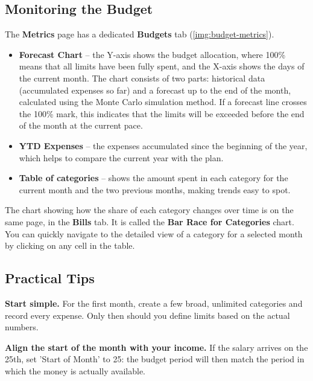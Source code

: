 

\newpage
\subsection{Monitoring the Budget}
\label{budget:metrics}

The \textbf{Metrics} page has a dedicated \textbf{Budgets} tab (\cref{img:budget-metrics}).


\begin{itemize}
  \item \textbf{Forecast Chart} -- the Y-axis shows the budget allocation, where 100\% means
  that all limits have been fully spent, and the X-axis shows the days of the current month.
  The chart consists of two parts: historical data (accumulated expenses so far) and a
  forecast up to the end of the month, calculated using the Monte Carlo simulation method. If
  a forecast line crosses the 100\% mark, this indicates that the limits will be exceeded
  before the end of the month at the current pace.
  \item \textbf{YTD Expenses} -- the expenses accumulated since the beginning of the year,
  which helps to compare the current year with the plan.
  \item \textbf{Table of categories} -- shows the amount spent in each category for the
  current month and the two previous months, making trends easy to spot.
\end{itemize}

\noindent The chart showing how the share of each category changes over time is on the same
page, in the \textbf{Bills} tab. It is called the \textbf{Bar Race for Categories} chart.
You can quickly navigate to the detailed view of a category for a selected month by clicking
on any cell in the table.


\subsection{Practical Tips}

\textbf{Start simple.} For the first month, create a few broad, unlimited categories
and record every expense. Only then should you define limits based on the actual numbers.

\textbf{Align the start of the month with your income.} If the salary arrives on the
25th, set 'Start of Month' to 25: the budget period will then match the period in which the
money is actually available.

